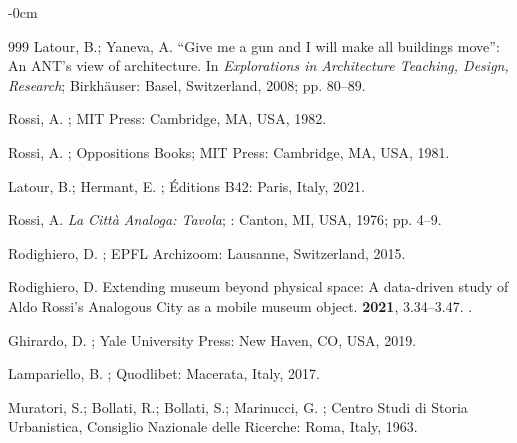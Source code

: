 \documentclass[land,article,accept,pdftex,oneauthor]{Definitions/mdpi}
\begin{document}
{\begin{adjustwidth}{-\extralength}{0cm}
\begin{thebibliography}{999}
Latour, B.; Yaneva, A.
\newblock ``{Give} me a gun and {I} will make all buildings move'': {An} {ANT}'s
  view of architecture. In \emph{Explorations in {Architecture} {Teaching}, {Design},
  {Research}}; Birkhäuser: {Basel, Switzerland,} %
  2008; pp. 80--89.

Rossi, A.
; MIT Press: Cambridge, MA, USA, {1982.} %


Rossi, A.
; Oppositions Books; MIT Press:
  Cambridge, MA, USA, 1981.

Latour, B.; Hermant, E.
; Éditions B42: Paris, Italy, 2021. %

Rossi, A.
\newblock \emph{La Città Analoga: Tavola};
: {Canton, MI, USA,} {1976}; pp. 4--9.

Rodighiero, D.
; EPFL Archizoom: Lausanne, Switzerland,
  2015.

Rodighiero, D.
\newblock Extending museum beyond physical space: A data-driven study of {Aldo}
  {Rossi}’s {Analogous} {City} as a mobile museum object.
 {\bf 2021},
{3.34--3.47.} %
.

Ghirardo, D.
; Yale University
  Press: New Haven,  CO, USA, 2019. %

Lampariello, B.
; Quodlibet: Macerata, Italy,
   2017.

Muratori, S.; Bollati, R.; Bollati, S.; Marinucci, G.
; Centro Studi di
  Storia Urbanistica, Consiglio Nazionale delle Ricerche: Roma, Italy, 1963.


\end{thebibliography}
\end{adjustwidth}}
\end{document}
